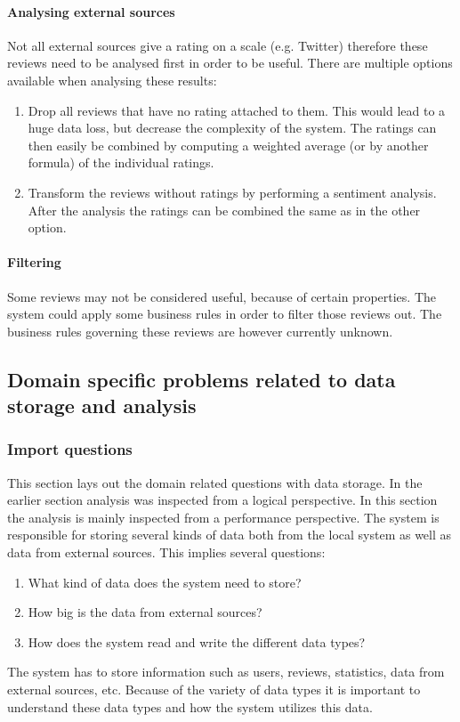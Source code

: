 \documentclass{article}
\begin{document}
\paragraph{Analysing external sources}
Not all external sources give a rating on a scale (e.g. Twitter) therefore these reviews need to be analysed first in order to be useful. There are multiple options available when analysing these results:
\begin{enumerate}
\item Drop all reviews that have no rating attached to them. This would lead to a huge data loss, but decrease the complexity of the system. The ratings can then easily be combined by computing a weighted average (or by another formula) of the individual ratings.
\item Transform the reviews without ratings by performing a sentiment analysis. After the analysis the ratings can be combined the same as in the other option.
\end{enumerate}

\paragraph{Filtering}
Some reviews may not be considered useful, because of certain properties. The system could apply some business rules in order to filter those reviews out. The business rules governing these reviews are however currently unknown. 




\subsection{Domain specific problems related to data storage and analysis}
\subsubsection{Import questions}
This section lays out the domain related questions with data storage. In the earlier section analysis was inspected from a logical perspective. In this section the analysis is mainly inspected from a performance perspective. 
The system is responsible for storing several kinds of data both from the local system as well as data from external sources. This implies several questions:
\begin{enumerate}
\item What kind of data does the system need to store?
\item How big is the data from external sources?
\item How does the system read and write the different data types?
\end{enumerate}
The system has to store information such as users, reviews, statistics, data from external sources, etc. Because of the variety of data types it is important to understand these data types and how the system utilizes this data.
\end{document}
